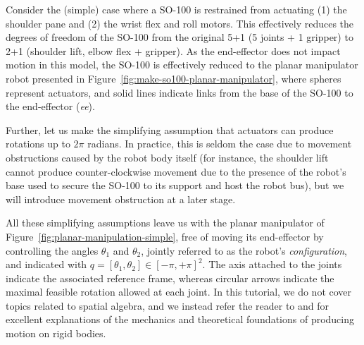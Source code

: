 Consider the (simple) case where a SO-100 is restrained from actuating (1) the shoulder pane and (2) the wrist flex and roll motors.
This effectively reduces the degrees of freedom of the SO-100 from the original 5+1 (5 joints + 1 gripper) to 2+1 (shoulder lift, elbow flex + gripper).
As the end-effector does not impact motion in this model, the SO-100 is effectively reduced to the planar manipulator robot presented in Figure~\ref{fig:make-so100-planar-manipulator}, where spheres represent actuators, and solid lines indicate links from the base of the SO-100 to the end-effector (\emph{ee}).

Further, let us make the simplifying assumption that actuators can produce rotations up to \( 2 \pi \) radians.
In practice, this is seldom the case due to movement obstructions caused by the robot body itself (for instance, the shoulder lift cannot produce counter-clockwise movement due to the presence of the robot's base used to secure the SO-100 to its support and host the robot bus), but we will introduce movement obstruction at a later stage.

All these simplifying assumptions leave us with the planar manipulator of Figure~\ref{fig:planar-manipulation-simple}, free of moving its end-effector by controlling the angles \( \theta_1 \) and \( \theta_2 \), jointly referred to as the robot's \emph{configuration}, and indicated with \( q = [\theta_1, \theta_2 ] \in [-\pi, +\pi]^2 \).
The axis attached to the joints indicate the associated reference frame, whereas circular arrows indicate the maximal feasible rotation allowed at each joint. 
In this tutorial, we do not cover topics related to spatial algebra, and we instead refer the reader to \citet[Chapter~2]{lynchModernRoboticsMechanics2017} and \citet[Chapter~3]{tedrakeRoboticManipulationPerception} for excellent explanations of the mechanics and theoretical foundations of producing motion on rigid bodies.

\newcommand{\panelheight}{3.2cm}  %

